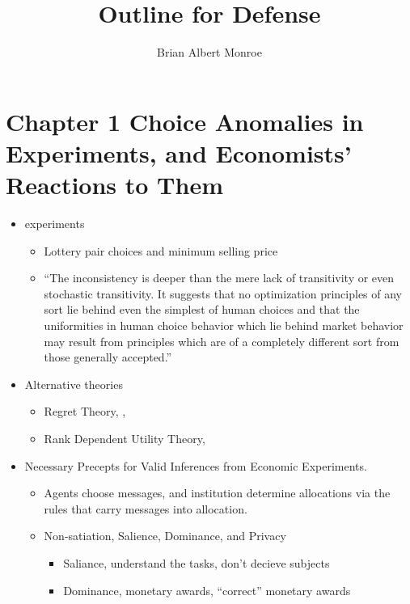 \documentclass[12pt,a4paper]{article}\usepackage[]{graphicx}\usepackage[]{color}
\title{Outline for Defense}
\author{Brian Albert Monroe}
\begin{document}
\maketitle



\doublespacing

\section{Chapter 1 Choice Anomalies in Experiments, and Economists’ Reactions to Them}

\begin{itemize}
	\item \textcite{Grether1979} experiments
		\begin{itemize}
			\item Lottery pair choices and minimum selling price
			\item “The inconsistency is deeper than the mere
lack of transitivity or even stochastic transitivity. It suggests that no optimization
principles of any sort lie behind even the simplest of human choices and that
the uniformities in human choice behavior which lie behind market behavior may
result from principles which are of a completely different sort from those generally
accepted.”
		\end{itemize}
	\item Alternative theories
		\begin{itemize}
			\item Regret Theory, \textcite{Bell1982}, \textcite{Loomes1982}
			\item Rank Dependent Utility Theory, \textcite{Quiggin1982}
		\end{itemize}
	\item \textcite{Smith1982} Necessary Precepts for Valid Inferences from Economic Experiments. 
		\begin{itemize}
			\item Agents choose messages, and institution determine allocations via the rules that carry messages into allocation.
			\item Non-satiation, Salience, Dominance, and Privacy
				\begin{itemize}
					\item Saliance, understand the tasks, don't decieve subjects
					\item Dominance, monetary awards, \enquote{correct} monetary awards

\end{itemize}
\end{itemize}
\end{itemize}
\end{document}
